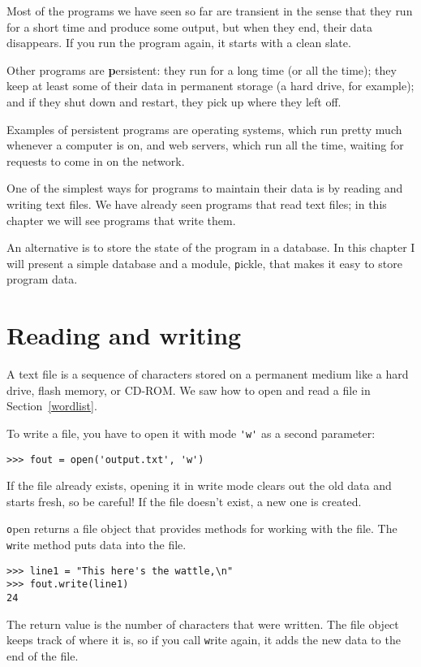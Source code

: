 \documentclass[
DIV=11,
fontsize=12,
twoside,
headinclude=false,
titlepage=firstiscover,
abstract=true,
headsepline=true,
footsepline=true,
chapterprefix=true, %
headings=big,
bibliography=totoc,%
captions=tableheading
]{scrbook}
\theoremstyle{definition}
\begin{document}
Most of the programs we have seen so far are transient in the
sense that they run for a short time and produce some output,
but when they end, their data disappears.  If you run the program
again, it starts with a clean slate.

Other programs are {\textbf persistent}: they run for a long time
(or all the time); they keep at least some of their data
in permanent storage (a hard drive, for example); and
if they shut down and restart, they pick up where they left off.

Examples of persistent programs are operating systems, which
run pretty much whenever a computer is on, and web servers,
which run all the time, waiting for requests to come in on
the network.

One of the simplest ways for programs to maintain their data
is by reading and writing text files.  We have already seen
programs that read text files; in this chapter we will see programs
that write them.

An alternative is to store the state of the program in a database.
In this chapter I will present a simple database and a module,
{\texttt pickle}, that makes it easy to store program data.


\section{Reading and writing}

A text file is a sequence of characters stored on a permanent
medium like a hard drive, flash memory, or CD-ROM.  We saw how
to open and read a file in Section~\ref{wordlist}.

To write a file, you have to open it with mode \verb"'w'" as a second
parameter:

\begin{lstlisting}
>>> fout = open('output.txt', 'w')
\end{lstlisting}
%
If the file already exists, opening it in write mode clears out
the old data and starts fresh, so be careful!
If the file doesn't exist, a new one is created.

{\texttt open} returns a file object that provides methods for working
with the file.
The {\texttt write} method puts data into the file.

\begin{lstlisting}
>>> line1 = "This here's the wattle,\n"
>>> fout.write(line1)
24
\end{lstlisting}
%
The return value is the number of characters that were written.
The file object keeps track of where it is, so if
you call {\texttt write} again, it adds the new data to the end of
the file.
\end{document}
